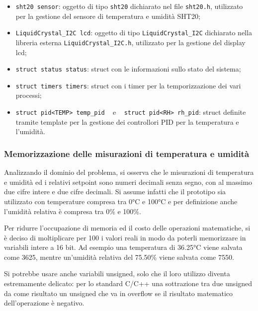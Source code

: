 \begin{itemize}
	\item \verb|sht20 sensor|: oggetto di tipo \verb|sht20| dichiarato nel file \verb|sht20.h|, utilizzato per la
	gestione del sensore di temperatura e umidità SHT20;
	\item \verb|LiquidCrystal_I2C lcd|: oggetto di tipo \verb|LiquidCrystal_I2C| dichiarato nella libreria esterna
	\verb|LiquidCrystal_I2C.h|, utilizzato per la gestione del display lcd;
	\item \verb|struct status status|: struct con le informazioni sullo stato del sistema;
	\item \verb|struct timers timers|: struct con i timer per la temporizzazione dei vari processi;
	\item \verb|struct pid<TEMP> temp_pid| ~ e ~ \verb|struct pid<RH> rh_pid|: struct definite tramite
	template per la gestione dei controllori PID per la temperatura e l'umidità.
\end{itemize}

\subsubsection{Memorizzazione delle misurazioni di temperatura e umidità}
Analizzando il dominio del problema, si osserva che le misurazioni di temperatura e umidità ed i relativi setpoint sono numeri
decimali senza segno, con al massimo due cifre intere e due cifre decimali. Si assume infatti che il prototipo sia utilizzato
con temperature compresa tra 0°C e 100°C e per definizione anche l'umidità relativa è compresa tra 0\% e 100\%.

Per ridurre l'occupazione di memoria ed il costo delle operazioni matematiche, si è deciso di moltiplicare per 100 i valori
reali in modo da poterli memorizzare in variabili intere a 16 bit. Ad esempio una temperatura di 36.25°C viene salvata come
3625, mentre un'umidità relativa del 75.50\% viene salvata come 7550.

Si potrebbe usare anche variabili unsigned, solo che il loro utilizzo diventa estremamente delicato: per lo standard C/C++
una sottrazione tra due unsigned da come risultato un unsigned che va in overflow se il risultato matematico dell'operazione
è negativo.

